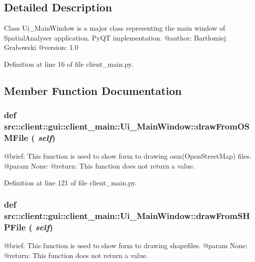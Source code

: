 \subsection{Detailed Description}
\begin{DoxyVerb}
Class Ui_MainWindow is a major class representing the
main window of SpatialAnalyser application. PyQT implementation.
@author: Bartlomiej Grabowski
@version: 1.0
\end{DoxyVerb}
 

Definition at line 16 of file client\_\-main.py.



\subsection{Member Function Documentation}
\hypertarget{classsrc_1_1client_1_1gui_1_1client__main_1_1Ui__MainWindow_a9fc02c87cbc80cd2c74f230513320c9b}{
\subsubsection[{drawFromOSMFile}]{\setlength{\rightskip}{0pt plus 5cm}def src::client::gui::client\_\-main::Ui\_\-MainWindow::drawFromOSMFile ( {\em self})}}
\label{classsrc_1_1client_1_1gui_1_1client__main_1_1Ui__MainWindow_a9fc02c87cbc80cd2c74f230513320c9b}
\begin{DoxyVerb}
@brief: This function is used to show form to drawing osm(OpenStreetMap) files.
@param None:
@return: This function does not return a value.
\end{DoxyVerb}
 

Definition at line 121 of file client\_\-main.py.

\hypertarget{classsrc_1_1client_1_1gui_1_1client__main_1_1Ui__MainWindow_ac024fe8fdfa6ecc540d17685c25aa3c6}{
\subsubsection[{drawFromSHPFile}]{\setlength{\rightskip}{0pt plus 5cm}def src::client::gui::client\_\-main::Ui\_\-MainWindow::drawFromSHPFile ( {\em self})}}
\label{classsrc_1_1client_1_1gui_1_1client__main_1_1Ui__MainWindow_ac024fe8fdfa6ecc540d17685c25aa3c6}
\begin{DoxyVerb}
@brief: This function is used to show form to drawing shapefiles.
@param None:
@return: This function does not return a value.
\end{DoxyVerb}
 

